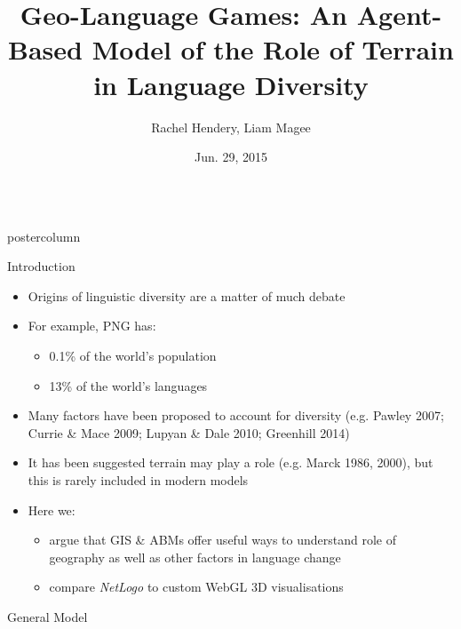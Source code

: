 \documentclass[final,hyperref={pdfpagelabels=false}]{beamer}
\title{\huge Geo-Language Games: An Agent-Based Model of the Role of Terrain in Language Diversity}
\author{Rachel Hendery, Liam Magee}
\institute[University of Western Sydney]{Digital Humanities Research Group, University of Western Sydney, Parramatta, Australia}
\date[Jun. 29, 2015]{Jun. 29, 2015}
\newlength{\columnheight}
\begin{document}
\begin{frame}
  \begin{columns}
    \begin{column}{.33\textwidth}
      \begin{beamercolorbox}[center,wd=\textwidth]{postercolumn}
        \begin{minipage}[T]{.95\textwidth}  %
          \parbox[t][\columnheight]{\textwidth}{ %
            \begin{block}{Introduction}
              \begin{itemize}
              \item Origins of linguistic diversity are a matter of much debate
              \item For example, PNG has:
                \begin{itemize}
                \item 0.1\% of the world's population
                \item 13\% of the world's languages
                \end{itemize}
              \item Many factors have been proposed to account for diversity (e.g. Pawley 2007; Currie \& Mace 2009; Lupyan \& Dale 2010; Greenhill 2014)
              \item It has been suggested terrain may play a role (e.g. Marck 1986, 2000), but this is rarely included in modern models
              \item Here we:
              \begin{itemize}
            \item argue that GIS \& ABMs offer useful ways to understand role of geography as well as other factors in language change
              \item compare \textit{NetLogo} to custom WebGL 3D visualisations \end{itemize}
              \end{itemize}
            \end{block}
            \vfill
            \begin{block}{General Model}

\end{block}}
\end{minipage}
\end{beamercolorbox}
\end{column}
\end{columns}
\end{frame}
\end{document}

